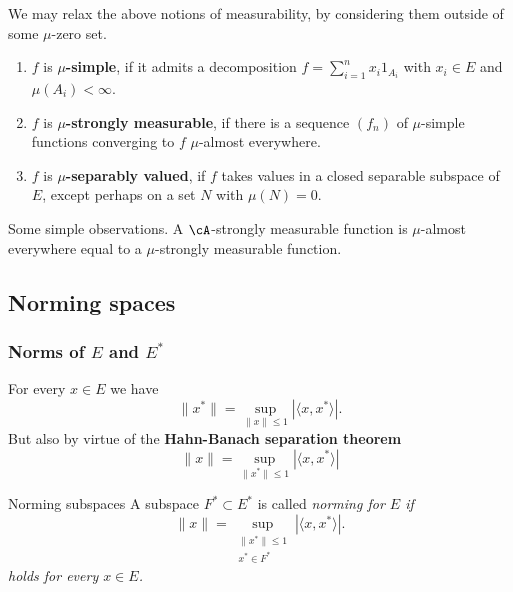 \begin{frame}
    We may relax the above notions of measurability, by considering them
    outside of some $\mu$-zero set.

    \begin{enumerate}
        \item $f$ is \textbf{$\mu$-simple}, if it admits a decomposition 
            $f=\sum_{i=1}^{n} x_i 1_{A_i}$ with $x_i \in E$ and $\mu(A_i)<\infty$.
        \item  $f$ is \textbf{$\mu$-strongly measurable}, if there is a sequence $(f_n)$
            of $\mu$-simple functions converging to $f$ $\mu$-almost everywhere.
        \item $f$ is \textbf{$\mu$-separably valued}, if $f$ takes values in a closed separable
            subspace of $E$, except perhaps on a set $N$ with $\mu(N)=0$. 
    \end{enumerate}

    \begin{block}{Some simple observations.}
        A $\cA$-strongly measurable function is $\mu$-almost everywhere equal to a 
        $\mu$-strongly measurable function. 
    \end{block}
\end{frame}

\subsection{Norming spaces}

\begin{frame}
    \frametitle{Norms of $E$ and $E^*$}
    
    For every $x\in E$ we have
    \begin{equation*}
        \| x^* \| = 
        \sup_{\| x \| \leq 1} | \langle x,x^* \rangle |.
    \end{equation*}
    But also by virtue of the \textbf{Hahn-Banach separation theorem}
    \begin{equation*}
        \| x \| = 
        \sup_{\| x^{*} \| \leq 1} | \langle x,x^* \rangle |
    \end{equation*}

    \begin{block}{Norming subspaces}
        A subspace $F^* \subset E^*$ is called \em{norming} for $E$ if
        \begin{equation*}
            \| x \| = 
            \sup_{\substack{ \| x^{*} \| \leq 1 \\ x^* \in F^* }} | \langle x,x^* \rangle |.
        \end{equation*} 
        holds for every $x\in E$. 
    \end{block}
\end{frame}

